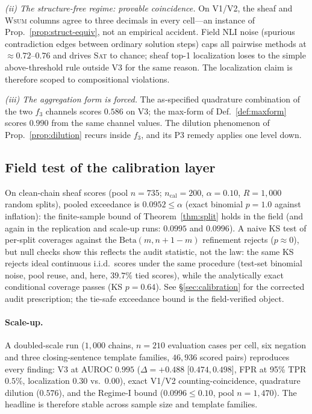 \emph{(ii) The structure-free regime: provable coincidence.} On V1/V2, the
sheaf and \textsc{Wsum} columns agree to three decimals in every cell---an
instance of Prop.~\ref{prop:struct-equiv}, not an empirical accident. Field
NLI noise (spurious contradiction edges between ordinary solution steps) caps
all pairwise methods at ${\approx}0.72$--$0.76$ and drives \textsc{Sat} to
chance; sheaf top-1 localization loses to the simple above-threshold rule
outside V3 for the same reason. The localization claim is therefore scoped to
compositional violations.

\emph{(iii) The aggregation form is forced.} The as-specified quadrature
combination of the two $f_3$ channels scores $0.586$ on V3; the max-form of
Def.~\ref{def:maxform} scores $0.990$ from the same channel values. The
dilution phenomenon of Prop.~\ref{prop:dilution} recurs inside $f_3$, and its
P3 remedy applies one level down.

\subsection{Field test of the calibration layer}
\label{sec:field-e2}

On clean-chain sheaf scores (pool $n=735$; $n_{\mathrm{cal}}=200$,
$\alpha=0.10$, $R=1{,}000$ random splits), pooled exceedance is
$0.0952\le\alpha$ (exact binomial $p=1.0$ against inflation): the
finite-sample bound of Theorem~\ref{thm:split} holds in the field (and again
in the replication and scale-up runs: $0.0995$ and $0.0996$). A naive KS test
of per-split coverages against the $\mathrm{Beta}(m,n+1-m)$ refinement
rejects ($p\approx 0$), but null checks show this reflects the audit
statistic, not the law: the same KS rejects ideal continuous i.i.d.\ scores
under the same procedure (test-set binomial noise, pool reuse, and, here,
$39.7\%$ tied scores), while the analytically exact conditional coverage
passes (KS $p=0.64$). See \S\ref{sec:calibration} for the corrected audit
prescription; the tie-safe exceedance bound is the field-verified object.

\paragraph{Scale-up.} A doubled-scale run ($1{,}000$ chains, $n=210$
evaluation cases per cell, six negation and three closing-sentence template
families, $46{,}936$ scored pairs) reproduces every finding: V3 at AUROC
$0.995$ ($\Delta=+0.488$ [$0.474,0.498$], FPR at 95\% TPR $0.5\%$,
localization $0.30$ vs.\ $0.00$), exact V1/V2 counting-coincidence, quadrature
dilution ($0.576$), and the Regime-I bound ($0.0996\le 0.10$, pool
$n=1{,}470$). The headline is therefore stable across sample size and
template families.

